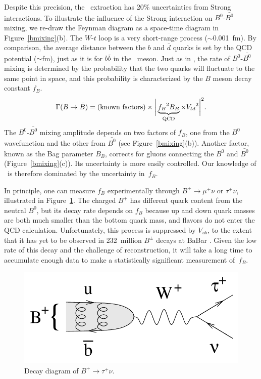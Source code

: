 \documentclass{cornell}
\begin{document}
Despite this precision, the \vtd\ extraction has 20\% uncertainties
from Strong interactions.  To illustrate the influence of the Strong
interaction on $B^0$-$\bar{B^0}$ mixing, we re-draw the Feynman
diagram as a space-time diagram in Figure~\ref{bmixing}(b).  The
$W$-$t$ loop is a very short-range process ($\sim$0.001~fm).  By
comparison, the average distance between the $b$ and $\bar{d}$ quarks
is set by the QCD potential ($\sim$fm), just as it is for $b\bar{b}$
in the \ups\ meson.  Just as in \gee, the rate of $B^0$-$\bar{B^0}$
mixing is determined by the probability that the two quarks will
fluctuate to the same point in space, and this probability is
characterized by the $B$ meson decay constant $f_B$.
\begin{equation}
  \Gamma(B \to \bar{B}) = \mbox{(known factors)} \times \bigg|
  \underbrace{{f_B}^2 B_B}_{\mbox{\scriptsize QCD}} \times {V_{td}}^2 \bigg|^2
  \mbox{.}
\end{equation}
The $B^0$-$\bar{B^0}$ mixing amplitude depends on two factors of
$f_B$, one from the $B^0$ wavefunction and the other from $\bar{B^0}$
(see Figure~\ref{bmixing}(b)).  Another factor, known as the Bag
parameter $B_B$, corrects for gluons connecting the $B^0$ and
$\bar{B^0}$ (Figure~\ref{bmixing}(c)).  Its uncertainty is more easily
controlled.  Our knowledge of \vtd\ is therefore dominated by the
uncertainty in~$f_B$.

In principle, one can measure $f_B$ experimentally through $B^+ \to
\mu^+ \nu$ or $\tau^+ \nu$, illustrated in Figure~\ref{btomunu}.  The
charged $B^+$ has different quark content from the neutral $B^0$, but
its decay rate depends on $f_B$ because up and down quark masses are
both much smaller than the bottom quark mass, and flavors do not enter
the QCD calculation.  Unfortunately, this process is suppressed by
$V_{ub}$, to the extent that it has yet to be observed in 232~million
$B^\pm$ decays at BaBar \cite{btaunu}.  Given the low rate of this
decay and the challenge of reconstruction, it will take a long time to
accumulate enough data to make a statistically significant measurement
of~$f_B$.

\begin{figure}[p]
  \begin{center}
    \includegraphics[width=0.5\linewidth]{plots/btomunu}
  \end{center}
  \caption[Decay diagram of $B^+ \to \tau^+ \nu$]{\label{btomunu}
  Decay diagram of $B^+ \to \tau^+ \nu$.}
\end{figure}
\end{document}
